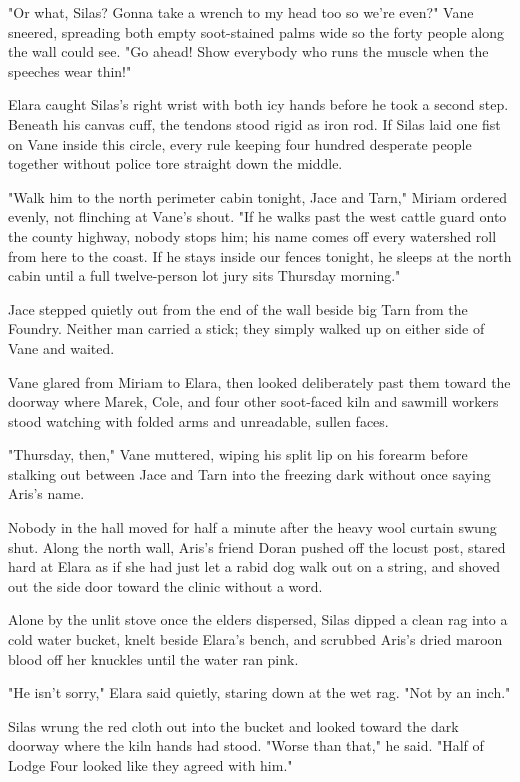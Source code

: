 "Or what, Silas? Gonna take a wrench to my head too so we're even?" Vane sneered, spreading both empty soot-stained palms wide so the forty people along the wall could see. "Go ahead! Show everybody who runs the muscle when the speeches wear thin!"

Elara caught Silas's right wrist with both icy hands before he took a second step. Beneath his canvas cuff, the tendons stood rigid as iron rod. If Silas laid one fist on Vane inside this circle, every rule keeping four hundred desperate people together without police tore straight down the middle.

"Walk him to the north perimeter cabin tonight, Jace and Tarn," Miriam ordered evenly, not flinching at Vane's shout. "If he walks past the west cattle guard onto the county highway, nobody stops him; his name comes off every watershed roll from here to the coast. If he stays inside our fences tonight, he sleeps at the north cabin until a full twelve-person lot jury sits Thursday morning."

Jace stepped quietly out from the end of the wall beside big Tarn from the Foundry. Neither man carried a stick; they simply walked up on either side of Vane and waited.

Vane glared from Miriam to Elara, then looked deliberately past them toward the doorway where Marek, Cole, and four other soot-faced kiln and sawmill workers stood watching with folded arms and unreadable, sullen faces.

"Thursday, then," Vane muttered, wiping his split lip on his forearm before stalking out between Jace and Tarn into the freezing dark without once saying Aris's name.

Nobody in the hall moved for half a minute after the heavy wool curtain swung shut. Along the north wall, Aris's friend Doran pushed off the locust post, stared hard at Elara as if she had just let a rabid dog walk out on a string, and shoved out the side door toward the clinic without a word.

Alone by the unlit stove once the elders dispersed, Silas dipped a clean rag into a cold water bucket, knelt beside Elara's bench, and scrubbed Aris's dried maroon blood off her knuckles until the water ran pink.

"He isn't sorry," Elara said quietly, staring down at the wet rag. "Not by an inch."

Silas wrung the red cloth out into the bucket and looked toward the dark doorway where the kiln hands had stood. "Worse than that," he said. "Half of Lodge Four looked like they agreed with him."
